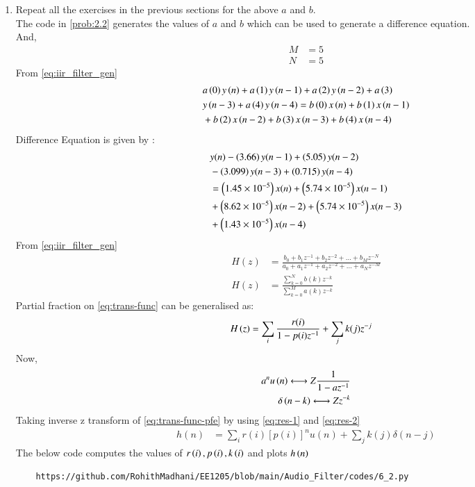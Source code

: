 \documentclass[journal,12pt,twocolumn]{IEEEtran}
\theoremstyle{remark}
\begin{document}
\begin{enumerate}[label=\thesection.\arabic*]
\item Repeat all the exercises in the previous sections for the above $a$ and $b$.\\
\solution The code in \ref{prob:2.2} generates the values of $a$ and $b$  which can be used to generate a difference equation.\\
And,
\begin{align}
    M &= 5\\
    N &= 5
\end{align}
From \ref{eq:iir_filter_gen} 
\begin{align}
    &a\left(0\right)y\left(n\right) + a\left(1\right)y\left(n-1\right)+a\left(2\right)y\left(n-2\right)+a\left(3\right)\\ \notag &y\left(n-3\right) + a\left(4\right)y\left(n-4\right) =   b\left(0\right)x\left(n\right) + b\left(1\right)x\left(n-1\right)\\ \notag &+b\left(2\right)x\left(n-2\right)+b\left(3\right)x\left(n-3\right) + b\left(4\right)x\left(n-4\right) 
\end{align}
Difference Equation is given by :
\begin{align}
	&y(n) - \left(3.66\right)y(n - 1) + \left(5.05\right)y(n - 2) \nonumber \\
	&- \left(3.099\right)y(n - 3) + \left(0.715\right)y(n - 4) \nonumber \\
	&= \left(1.45\times 10^{-5}\right)x(n) + \left(5.74 \times 10^{-5}\right)x(n - 1) \nonumber \\
	&+ \left(8.62 \times 10^{-5}\right)x(n - 2) + \left(5.74 \times 10^{-5}\right)x(n - 3) \nonumber \\
	&+ \left(1.43 \times 10^{-5}\right)x(n - 4)
\end{align}
From \eqref{eq:iir_filter_gen} 
\begin{align}
    H(z) &= \frac{b_0 + b_1 z^{-1} + b_2 z^{-2} + \ldots + b_M z^{-N}}{a_0 + a_1 z^{-1} + a_2 z^{-2} + \ldots + a_N z^{-M}}\\
    H(z) &= \frac{\sum_{k = 0}^{N}b(k)z^{-k}}{\sum_{k = 0}^{M}a(k)z^{-k}} \label{eq:trans-func}
\end{align}
Partial fraction on \eqref{eq:trans-func} can be generalised as:
\begin{align}
    H\left(z\right)&= \sum_{i}\frac{r(i)}{1 - p(i)z^{-1}} + \sum_{j}k(j)z^{-j}
	\label{eq:trans-func-pfe}
\end{align}
Now,
\begin{align}
    a^{n}u\brak{n} \system{Z} \frac{1}{1-az^{-1}} \label{eq:res-1}\\
    \delta\brak{n-k} \system{Z} z^{-k}\label{eq:res-2}
\end{align}
Taking inverse z transform of \eqref{eq:trans-func-pfe} by using \eqref{eq:res-1} and \eqref{eq:res-2}
\begin{align}
h(n) &= \sum_{i}r(i)[p(i)]^nu(n) + \sum_{j}k(j)\delta(n - j)
	\label{eq:h-n-expr}
\end{align}
The below code computes the values of $r\left(i\right),p\left(i\right) , k\left(i\right)$ and plots $h\left(n\right)$
\begin{lstlisting}
    https://github.com/RohithMadhani/EE1205/blob/main/Audio_Filter/codes/6_2.py
\end{lstlisting}



\end{enumerate}
\end{document}
